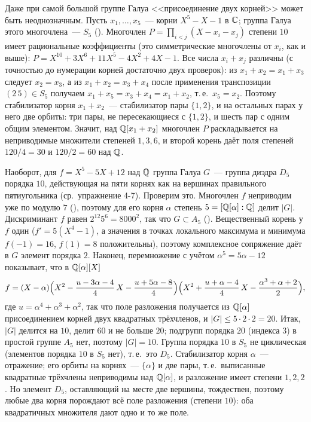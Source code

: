 \begin{aside}[2.4d]
Даже при самой большой группе Галуа <<присоединение двух корней>> может быть неоднозначным. Пусть $x_1,\dots,x_5$~---
корни $X^5-X-1$ в $\mathbb C$; группа Галуа этого многочлена~--- $S_5$ (). Многочлен $P=\prod_{i<j}(X-x_i-x_j)$
степени $10$ имеет рациональные коэффициенты (это симметрические многочлены от $x_i$, как и выше):
$P=X^{10}+3X^6+11X^5-4X^2+4X-1$. Все числа $x_i+x_j$ различны (с точностью до нумерации корней достаточно двух проверок): из $x_1+x_2=x_1+x_3$
следует $x_2=x_3$, а из $x_1+x_2=x_3+x_4$ после применения транспозиции $(2\,5)\in S_5$ получаем
$x_1+x_5=x_3+x_4=x_1+x_2$, т.\,е.\ $x_5=x_2$. Поэтому стабилизатор
корня $x_1+x_2$~--- стабилизатор пары $\{1,2\}$, и на остальных парах у него две орбиты: три пары, не пересекающиеся с
$\{1,2\}$, и шесть пар с одним общим элементом. Значит, над $\mathbb Q[x_1+x_2]$ многочлен $P$ раскладывается на неприводимые
множители степеней $1,3,6$, и второй корень даёт поля степеней $120/4=30$ и $120/2=60$ над $\mathbb Q$.

Наоборот, для $f=X^5-5X+12$ над $\mathbb Q$ группа Галуа $G$~--- группа диэдра $D_5$ порядка $10$, действующая на пяти корнях
как на вершинах правильного пятиугольника (ср.\ упражнение 4-7). Проверим это. Многочлен $f$ неприводим уже по модулю
$7$ (), поэтому для его корня $\alpha$ степень $5=[\mathbb Q[\alpha]:\mathbb Q]$ делит $|G|$. Дискриминант $f$ равен
$2^{12}5^6=8000^2$, так что $G\subset A_5$ (). Вещественный корень у $f$ один ($f'=5(X^4-1)$, а значения в
точках локального максимума и минимума $f(-1)=16$, $f(1)=8$ положительны), поэтому комплексное сопряжение даёт в $G$
элемент порядка $2$. Наконец, перемножение с учётом $\alpha^5=5\alpha-12$ показывает, что в $\mathbb Q[\alpha][X]$
\[
f=(X-\alpha)\Bigl(X^2-\frac{u-3\alpha-4}4\,X-\frac{u+5\alpha-8}4\Bigr)\Bigl(X^2+\frac{u+\alpha-4}4\,X-\frac{\alpha^3+\alpha+2}2\Bigr),
\]
где $u=\alpha^4+\alpha^3+\alpha^2$, так что поле разложения получается из $\mathbb Q[\alpha]$ присоединением корней двух квадратных трёхчленов, и $|G|\le5\cdot2\cdot2=20$.
Итак, $|G|$ делится на $10$, делит $60$ и не больше $20$; подгрупп порядка $20$ (индекса $3$) в простой группе $A_5$ нет,
поэтому $|G|=10$. Группа порядка $10$ в $S_5$ не циклическая (элементов порядка $10$ в $S_5$ нет), т.\,е.\ это $D_5$.
Стабилизатор корня $\alpha$~--- отражение; его орбиты на корнях~--- $\{\alpha\}$ и две пары, т.\,е.\ выписанные
квадратные трёхчлены неприводимы над $\mathbb Q[\alpha]$, и разложение имеет степени $1,2,2$. Но элемент $D_5$,
оставляющий на месте две вершины, тождествен, поэтому любые два корня порождают всё поле разложения (степени $10$):
оба квадратичных множителя дают одно и то же поле.
\end{aside}
